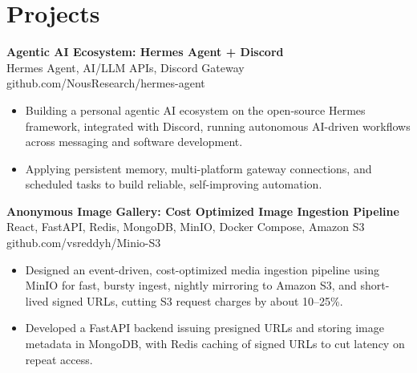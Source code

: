 \documentclass[a4paper,11pt]{article}
\newcommand{\resumeItem}[1]{\item \small{#1}}
\newcommand{\resumeSubheading}[4]{%
  \textbf{#1} \hfill \textbf{#2} \\
{#3} \hfill {#4}
}
\newcommand{\resumeSubHeadingListStart}{\begin{itemize}}
\newcommand{\resumeSubHeadingListEnd}{\end{itemize}}
\begin{document}
\section*{Projects}

\resumeSubheading
{Agentic AI Ecosystem: Hermes Agent + Discord}{}{Hermes Agent, AI/LLM APIs, Discord Gateway}{github.com/NousResearch/hermes-agent}
\resumeSubHeadingListStart
\resumeItem{Building a personal agentic AI ecosystem on the open-source Hermes framework, integrated with Discord, running autonomous AI-driven workflows across messaging and software development.}
\resumeItem{Applying persistent memory, multi-platform gateway connections, and scheduled tasks to build reliable, self-improving automation.}
\resumeSubHeadingListEnd

\resumeSubheading
{Anonymous Image Gallery: Cost Optimized Image Ingestion Pipeline}{}{React, FastAPI, Redis, MongoDB, MinIO, Docker Compose, Amazon S3}{github.com/vsreddyh/Minio-S3}
\resumeSubHeadingListStart
\resumeItem{Designed an event-driven, cost-optimized media ingestion pipeline using MinIO for fast, bursty ingest, nightly mirroring to Amazon S3, and short-lived signed URLs, cutting S3 request charges by about 10--25\%.}
\resumeItem{Developed a FastAPI backend issuing presigned URLs and storing image metadata in MongoDB, with Redis caching of signed URLs to cut latency on repeat access.}
\resumeSubHeadingListEnd


\vspace{-0.6em}
\end{document}

